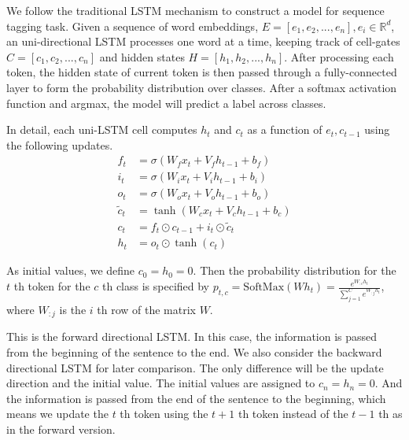 \documentclass{article}
\begin{document}
We follow the traditional LSTM mechanism to construct a model for sequence tagging task. Given a sequence of word embeddings, $E = [e_1, e_2, ... , e_n], e_i \in \mathbb{R}^d$, an uni-directional LSTM processes one word at a time, keeping track of cell-gates $C = [c_1, c_2, ... , c_n]$ and hidden states $H = [h_1, h_2, ... , h_n]$. After processing each token, the hidden state of current token is then passed through a fully-connected layer to form the probability distribution over classes. After a softmax activation function and argmax, the model will predict a label across classes.

In detail, each uni-LSTM cell computes $h_t$ and $c_t$ as a function of $e_t, c_{t-1}$ using the following updates. 
\begin{align}\label{eq:f1}
f_t & = \sigma(W_f x_t + V_f h_{t - 1} + b_f) \\
i_t & = \sigma(W_i x_t + V_i h_{t - 1} + b_i) \\
o_t & = \sigma(W_o x_t + V_o h_{t - 1} + b_o) \\
\tilde{c}_t & = \tanh(W_c x_t + V_c h_{t - 1} + b_c) \\
c_t & = f_t \odot c_{t - 1} + i_t \odot \tilde{c}_t \\
h_t & = o_t \odot \tanh(c_t)
\end{align}

As initial values, we define $c_0=h_0=0$. 
Then the probability distribution for the $t$ th token for the $c$ th class is specified by $p_{t, c} = \text{SoftMax}(W h_t) = \frac{e^{W_{:c} h_t}}{\sum_{j = 1} ^ C e^{W_{:j} h_t}}$, where $W_{:j}$ is the $i$ th row of the matrix $W$.

This is the forward directional LSTM. In this case, the information is passed from the beginning of the sentence to the end. We also consider the backward directional LSTM for later comparison. The only difference will be the update direction and the initial value. The initial values are assigned to $c_n=h_n=0$. And the information is passed from the end of the sentence to the beginning, which means we update the $t$ th token using the $t+1$ th token instead of the $t-1$ th as in the forward version.
\end{document}

